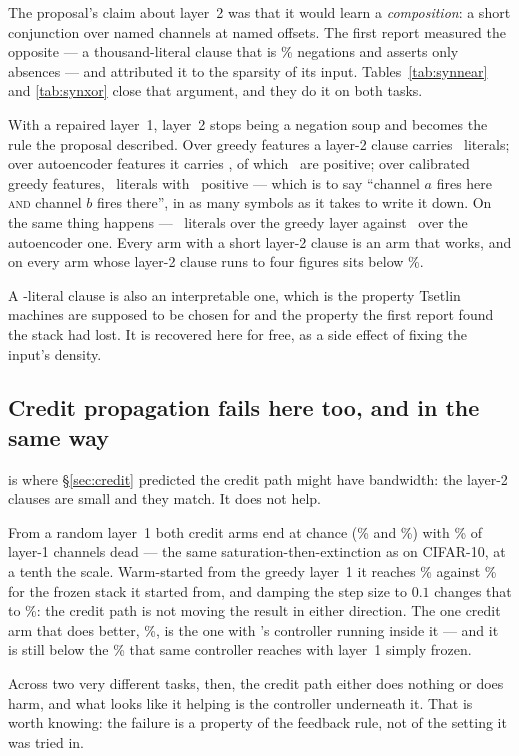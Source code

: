 The proposal's claim about layer~2 was that it would learn a \emph{composition}: a short
conjunction over named channels at named offsets. The first report measured the opposite ---
a thousand-literal clause that is \negMctm{}\% negations and asserts only absences --- and
attributed it to the sparsity of its input. Tables~\ref{tab:synnear} and \ref{tab:synxor}
close that argument, and they do it on both tasks.

\begin{ttkey}
With a repaired layer~1, layer~2 stops being a negation soup and becomes the rule the proposal
described. Over greedy features a layer-2 clause carries \synltwoNearMctmTask\ literals; over
autoencoder features it carries \synltwoNearAutoAuto, of which \synltwoposNearAutoAuto\ are
positive; over calibrated greedy features, \synltwoNearCalibTask\ literals with
\synltwoposNearCalibTask\ positive --- which is to say ``channel $a$ fires here \textsc{and}
channel $b$ fires there'', in as many symbols as it takes to write it down. On  the
same thing happens --- \synltwoXorMctmTask\ literals over the greedy layer against
\synltwoXorAutoAuto\ over the autoencoder one. Every arm with a short layer-2 clause is an arm
that works, and on  every arm whose layer-2 clause runs to four figures sits below
\synNearMctmTask{}\%.
\end{ttkey}

A \synltwoNearCalibTask-literal clause is also an interpretable one, which is the property
Tsetlin machines are supposed to be chosen for and the property the first report found the
stack had lost. It is recovered here for free, as a side effect of fixing the input's density.

\subsection{Credit propagation fails here too, and in the same way}

 is where \S\ref{sec:credit} predicted the credit path might have bandwidth: the
layer-2 clauses are small and they match. It does not help.

From a random layer~1 both credit arms end at chance (\synNearCreditIaRandom{}\% and
\synNearCreditRandom{}\%) with \syndeadNearCreditIaRandom{}\% of layer-1 channels dead ---
the same saturation-then-extinction as on CIFAR-10, at a tenth the scale. Warm-started from
the greedy layer~1 it reaches \synNearCreditWarmTask{}\% against \synNearMctmTask{}\% for the
frozen stack it started from, and damping the step size to $0.1$ changes that to
\synNearCreditWarmPOneTask{}\%: the credit path is not moving the result in either direction.
The one credit arm that does better, \synNearCreditCalTask{}\%, is the one with \ideaB's
controller running inside it --- and it is still below the \synNearCalibTask{}\% that same
controller reaches with layer~1 simply frozen.

Across two very different tasks, then, the credit path either does nothing or does harm, and
what looks like it helping is the controller underneath it. That is worth knowing: the failure
is a property of the feedback rule, not of the setting it was tried in.
